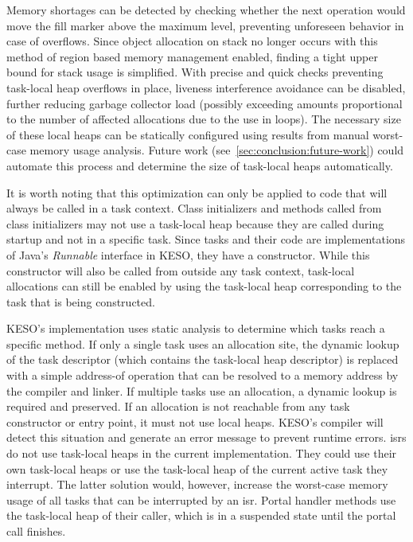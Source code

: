			Memory shortages can be detected by checking whether the next operation would move the fill marker above the
			maximum level, preventing unforeseen behavior in case of overflows. Since object allocation on stack no longer
			occurs with this method of region based memory management enabled, finding a tight upper bound for stack usage is
			simplified. With precise and quick checks preventing task-local heap overflows in place, liveness interference
			avoidance can be disabled, further reducing garbage collector load (possibly exceeding amounts proportional to the
			number of affected allocations due to the use in loops). The necessary size of these local heaps can be statically
			configured using results from manual worst-case memory usage analysis. Future work
			(see~\cref{sec:conclusion:future-work}) could automate this process and determine the size of task-local heaps
			automatically.

			It is worth noting that this optimization can only be applied to code that will always be called in a task
			context. Class initializers and methods called from class initializers may not use a task-local heap because they
			are called during startup and not in a specific task. Since tasks and their code are implementations of Java's
			\emph{Runnable} interface in KESO, they have a constructor. While this constructor will also be called from
			outside any task context, task-local allocations can still be enabled by using the task-local heap corresponding
			to the task that is being constructed.

			KESO's implementation uses static analysis to determine which tasks reach a specific method. If only a single task
			uses an allocation site, the dynamic lookup of the task descriptor (which contains the task-local heap descriptor)
			is replaced with a simple address-of operation that can be resolved to a memory address by the compiler and
			linker. If multiple tasks use an allocation, a dynamic lookup is required and preserved. If an allocation is not
			reachable from any task constructor or entry point, it must not use local heaps. KESO's compiler will detect this
			situation and generate an error message to prevent runtime errors. \Glspl{isr} do not use task-local heaps in the
			current implementation. They could use their own task-local heaps or use the task-local heap of the current active
			task they interrupt. The latter solution would, however, increase the worst-case memory usage of all tasks that
			can be interrupted by an \gls{isr}. Portal handler methods use the task-local heap of their caller, which is in
			a suspended state until the portal call finishes.

